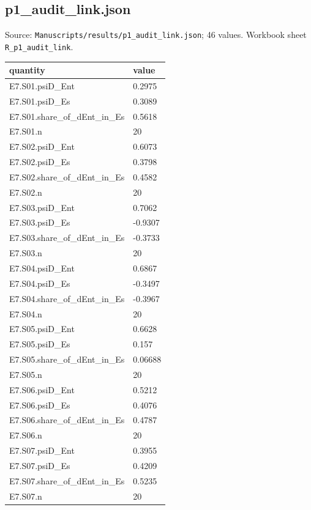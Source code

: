 \subsection*{p1\_audit\_link.json}
\noindent\small Source: \nolinkurl{Manuscripts/results/p1_audit_link.json}; 46 values. Workbook sheet \texttt{R\_p1\_audit\_link}.\par
{\scriptsize\begin{longtable}{p{}p{}}\toprule\textbf{quantity} & \textbf{value}\\\midrule\endhead
{}E7.S01.psiD\_Ent & 0.2975\\
{}E7.S01.psiD\_Es & 0.3089\\
{}E7.S01.share\_of\_dEnt\_in\_Es & 0.5618\\
{}E7.S01.n & 20\\
{}E7.S02.psiD\_Ent & 0.6073\\
{}E7.S02.psiD\_Es & 0.3798\\
{}E7.S02.share\_of\_dEnt\_in\_Es & 0.4582\\
{}E7.S02.n & 20\\
{}E7.S03.psiD\_Ent & 0.7062\\
{}E7.S03.psiD\_Es & -0.9307\\
{}E7.S03.share\_of\_dEnt\_in\_Es & -0.3733\\
{}E7.S03.n & 20\\
{}E7.S04.psiD\_Ent & 0.6867\\
{}E7.S04.psiD\_Es & -0.3497\\
{}E7.S04.share\_of\_dEnt\_in\_Es & -0.3967\\
{}E7.S04.n & 20\\
{}E7.S05.psiD\_Ent & 0.6628\\
{}E7.S05.psiD\_Es & 0.157\\
{}E7.S05.share\_of\_dEnt\_in\_Es & 0.06688\\
{}E7.S05.n & 20\\
{}E7.S06.psiD\_Ent & 0.5212\\
{}E7.S06.psiD\_Es & 0.4076\\
{}E7.S06.share\_of\_dEnt\_in\_Es & 0.4787\\
{}E7.S06.n & 20\\
{}E7.S07.psiD\_Ent & 0.3955\\
{}E7.S07.psiD\_Es & 0.4209\\
{}E7.S07.share\_of\_dEnt\_in\_Es & 0.5235\\
{}E7.S07.n & 20\\

\end{longtable}}
